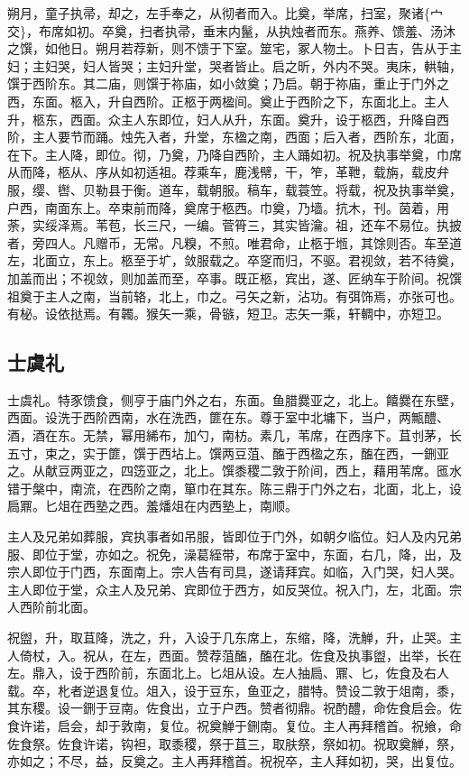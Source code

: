 \documentclass[]{article}
\begin{document}
朔月，童子执帚，却之，左手奉之，从彻者而入。比奠，举席，扫室，聚诸\{宀交\}，布席如初。卒奠，扫者执帚，垂末内鬣，从执烛者而东。燕养、馈羞、汤沐之馔，如他日。朔月若荐新，则不馈于下室。筮宅，冢人物土。卜日吉，告从于主妇；主妇哭，妇人皆哭；主妇升堂，哭者皆止。启之昕，外内不哭。夷床，輁轴，馔于西阶东。其二庙，则馔于祢庙，如小敛奠；乃启。朝于祢庙，重止于门外之西，东面。柩入，升自西阶。正柩于两楹间。奠止于西阶之下，东面北上。主人升，柩东，西面。众主人东即位，妇人从升，东面。奠升，设于柩西，升降自西阶，主人要节而踊。烛先入者，升堂，东楹之南，西面；后入者，西阶东，北面，在下。主人降，即位。彻，乃奠，乃降自西阶，主人踊如初。祝及执事举奠，巾席从而降，柩从、序从如初适祖。荐乘车，鹿浅幦，干，笮，革靾，载旃，载皮弁服，缨、辔、贝勒县于衡。道车，载朝服。稿车，载蓑笠。将载，祝及执事举奠，户西，南面东上。卒束前而降，奠席于柩西。巾奠，乃墙。抗木，刊。茵着，用荼，实绥泽焉。苇苞，长三尺，一编。菅筲三，其实皆瀹。祖，还车不易位。执披者，旁四人。凡赠币，无常。凡糗，不煎。唯君命，止柩于堩，其馀则否。车至道左，北面立，东上。柩至于圹，敛服载之。卒窆而归，不驱。君视敛，若不待奠，加盖而出；不视敛，则加盖而至，卒事。既正柩，宾出，遂、匠纳车于阶间。祝馔祖奠于主人之南，当前辂，北上，巾之。弓矢之新，沾功。有弭饰焉，亦张可也。有柲。设依挞焉。有韣。猴矢一乘，骨镞，短卫。志矢一乘，轩輖中，亦短卫。

\hypertarget{header-n64}{%
\subsection{士虞礼}\label{header-n64}}

士虞礼。特豕馈食，侧亨于庙门外之右，东面。鱼腊爨亚之，北上。饎爨在东壁，西面。设洗于西阶西南，水在洗西，篚在东。尊于室中北墉下，当户，两甒醴、酒，酒在东。无禁，幂用絺布，加勺，南枋。素几，苇席，在西序下。苴刌茅，长五寸，束之，实于篚，馔于西坫上。馔两豆菹、醢于西楹之东，醢在西，一鉶亚之。从献豆两亚之，四笾亚之，北上。馔黍稷二敦于阶间，西上，藉用苇席。匜水错于槃中，南流，在西阶之南，箪巾在其东。陈三鼎于门外之右，北面，北上，设扃鼏。匕俎在西塾之西。羞燔俎在内西塾上，南顺。

主人及兄弟如葬服，宾执事者如吊服，皆即位于门外，如朝夕临位。妇人及内兄弟服、即位于堂，亦如之。祝免，澡葛絰带，布席于室中，东面，右几，降，出，及宗人即位于门西，东面南上。宗人告有司具，遂请拜宾。如临，入门哭，妇人哭。主人即位于堂，众主人及兄弟、宾即位于西方，如反哭位。祝入门，左，北面。宗人西阶前北面。

祝盥，升，取苴降，洗之，升，入设于几东席上，东缩，降，洗觯，升，止哭。主人倚杖，入。祝从，在左，西面。赞荐菹醢，醢在北。佐食及执事盥，出举，长在左。鼎入，设于西阶前，东面北上。匕俎从设。左人抽扃、鼏、匕，佐食及右人载。卒，朼者逆退复位。俎入，设于豆东，鱼亚之，腊特。赞设二敦于俎南，黍，其东稷。设一鉶于豆南。佐食出，立于户西。赞者彻鼎。祝酌醴，命佐食启会。佐食许诺，启会，却于敦南，复位。祝奠觯于鉶南。复位。主人再拜稽首。祝飨，命佐食祭。佐食许诺，钩袒，取黍稷，祭于苴三，取肤祭，祭如初。祝取奠觯，祭，亦如之；不尽，益，反奠之。主人再拜稽首。祝祝卒，主人拜如初，哭，出复位。
\end{document}
